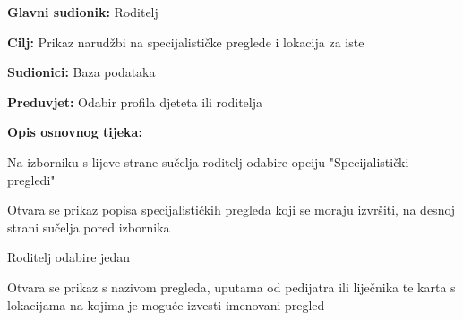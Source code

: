 					\noindent {}
					\begin{packed_item}
						
						\item \textbf{Glavni sudionik: }Roditelj
						\item  \textbf{Cilj:} Prikaz narudžbi na specijalističke preglede i lokacija za iste
						\item  \textbf{Sudionici:} Baza podataka
						\item  \textbf{Preduvjet:} Odabir profila djeteta ili roditelja
						\item  \textbf{Opis osnovnog tijeka:}
						
						\item[] \begin{packed_enum}
							
							\item Na izborniku s lijeve strane sučelja roditelj odabire opciju "Specijalistički pregledi"
							\item Otvara se prikaz popisa specijalističkih pregleda koji se moraju izvršiti, na desnoj strani sučelja pored izbornika
							\item Roditelj odabire jedan
							\item Otvara se prikaz s nazivom pregleda, uputama od pedijatra ili liječnika te karta s lokacijama na kojima je moguće izvesti imenovani pregled 
						\end{packed_enum}

					\end{packed_item}
					
